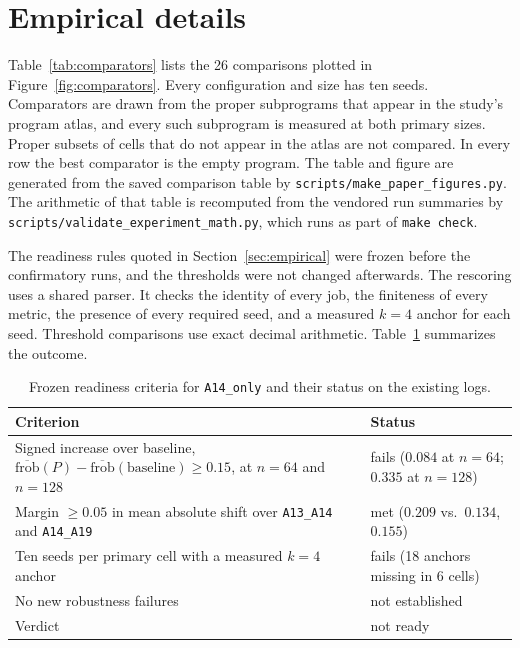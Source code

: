 \section{Empirical details}\label{app:empirical-details}

Table~\ref{tab:comparators} lists the 26 comparisons plotted in Figure~\ref{fig:comparators}. Every configuration and size has ten seeds. Comparators are drawn from the proper subprograms that appear in the study's program atlas, and every such subprogram is measured at both primary sizes. Proper subsets of cells that do not appear in the atlas are not compared. In every row the best comparator is the empty program. The table and figure are generated from the saved comparison table by \texttt{scripts/make\_paper\_figures.py}. The arithmetic of that table is recomputed from the vendored run summaries by \texttt{scripts/validate\_experiment\_math.py}, which runs as part of \texttt{make check}.

\begin{table}[ht]
\caption{Gains in absolute $\mathrm{frob}$ shift over the nearest nonempty proper subprogram and over the best measured proper subprogram, at the primary sizes $n=64$ and $n=128$. Values are rounded to three decimals.}
\label{tab:comparators}
\centering
\small

\end{table}

The readiness rules quoted in Section~\ref{sec:empirical} were frozen before the confirmatory runs, and the thresholds were not changed afterwards. The rescoring uses a shared parser. It checks the identity of every job, the finiteness of every metric, the presence of every required seed, and a measured $k=4$ anchor for each seed. Threshold comparisons use exact decimal arithmetic. Table~\ref{tab:readiness} summarizes the outcome.

\begin{table}[ht]
\caption{Frozen readiness criteria for \texttt{A14\_only} and their status on the existing logs.}
\label{tab:readiness}
\centering
\small
\begin{tabularx}{\textwidth}{@{}X l@{}}
\toprule
Criterion & Status \\
\midrule
Signed increase over baseline, $\overline{\mathrm{frob}}(P)-\overline{\mathrm{frob}}(\text{baseline})\ge 0.15$, at $n=64$ and $n=128$ & fails ($0.084$ at $n=64$; $0.335$ at $n=128$) \\
Margin $\ge 0.05$ in mean absolute shift over \texttt{A13\_A14} and \texttt{A14\_A19} & met ($0.209$ vs.\ $0.134$, $0.155$) \\
Ten seeds per primary cell with a measured $k=4$ anchor & fails (18 anchors missing in 6 cells) \\
No new robustness failures & not established \\
\midrule
Verdict & not ready \\
\bottomrule
\end{tabularx}
\end{table}
